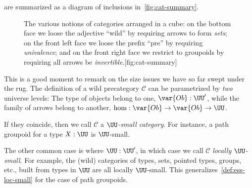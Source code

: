 are summarized as a diagram of inclusions in~\cref{fig:cat-summary}.

\begin{figure}
\begin{sidecaption}%
  {The various notions of categories arranged in a cube: on the bottom face
    we loose the adjective ``wild'' by requiring arrows to form \emph{sets};
    on the front left face we loose the prefix ``pre'' by requiring
    \emph{univalence}; and on the front right face we restrict to groupoids by
    requiring all arrows be \emph{invertible}.}[fig:cat-summary]
  \centering
  \footnotesize
\end{sidecaption}
\end{figure}

\begin{remark}\label{rem:cat-sizes}
  This is a good moment to remark on the size issues
  we have so far swept under the rug.
  The definition of a wild precategory $\mathcal C$ can be parametrized by
  \emph{two} universe levels: The type of objects belong to one, $\var{Ob}:\UU'$,
  while the family of arrows belong to another, $\hom : \var{Ob} \to \var{Ob} \to \UU$.

  If they coincide, then we call $\mathcal C$ a \emph{$\UU$-small category}.
  For instance, a path groupoid for a type $X:\UU$ is $\UU$-small.

  The other common case is where $\UU:\UU'$, in which case
  we call $\mathcal C$ \emph{locally $\UU$-small}.
  For example, the (wild) categories of types, sets, pointed types, groups, etc., built
  from types in $\UU$ are all locally $\UU$-small.
  This generalizes~\cref{def:ess-loc-small} for the case of path groupoids.
\end{remark}

